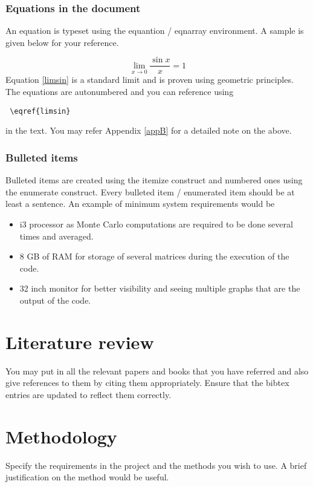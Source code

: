 \documentclass{book}
\begin{document}
\subsection{Equations in the document}

An equation is typeset using the equantion / eqnarray environment. A sample is given below for your reference. 

\begin{equation}
	\displaystyle \lim_{x \rightarrow 0} \frac{\sin{x}}{x} = 1
	\label{limsin}
\end{equation}
Equation \eqref{limsin} is a standard limit and is proven using geometric principles. 
The equations are autonumbered and you can reference using \begin{verbatim} \eqref{limsin} \end{verbatim} in the text. 
You may refer Appendix \ref{appB} for a detailed note on the above. 
\subsection{Bulleted items}

Bulleted items are created using the itemize construct and numbered ones using the enumerate construct. Every bulleted item / enumerated item should be at least a sentence. An example of minimum system requirements would be 

\begin{itemize}
\item i3 processor as Monte Carlo computations are required to be done several times and averaged.  
\item 8 GB of RAM for storage of several matrices during the execution of the code. 
\item 32 inch monitor for better visibility and seeing multiple graphs that are the output of the code.
\end{itemize}







\chapter{Literature review}
You may put in all the relevant papers and books that you have referred and also give references to them by citing them appropriately. Ensure that the bibtex entries are updated to reflect them correctly. 
\chapter{Methodology}
Specify the requirements in the project and the methods you wish to use. A brief justification on the method would be useful. 
\end{document}
